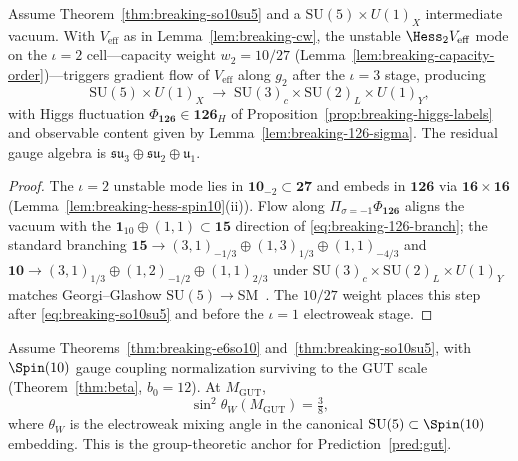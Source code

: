 \begin{theorem}\label{thm:breaking-su5sm}
Assume Theorem~\ref{thm:breaking-so10su5} and a
$\mathrm{SU}(5)\times U(1)_X$ intermediate vacuum. With $V_{\mathrm{eff}}$ as
in Lemma~\ref{lem:breaking-cw}, the unstable $\Hess_2 V_{\mathrm{eff}}$ mode on
the $\iota=2$ cell---capacity weight $w_2=10/27$
(Lemma~\ref{lem:breaking-capacity-order})---triggers gradient flow of
$V_{\mathrm{eff}}$ along $g_2$ after the $\iota=3$ stage, producing
\begin{equation}\label{eq:breaking-su5sm}
  \mathrm{SU}(5)\times U(1)_X
  \;\longrightarrow\;
  \mathrm{SU}(3)_c\times\mathrm{SU}(2)_L\times U(1)_Y,
\end{equation}
with Higgs fluctuation $\Phi_{\mathbf{126}}\in\mathbf{126}_H$ of
Proposition~\ref{prop:breaking-higgs-labels} and observable content given by
Lemma~\ref{lem:breaking-126-sigma}. The residual gauge algebra is
$\mathfrak{su}_3\oplus\mathfrak{su}_2\oplus\mathfrak{u}_1$.
\end{theorem}

\begin{proof}
The $\iota=2$ unstable mode lies in $\mathbf{10}_{-2}\subset\mathbf{27}$ and
embeds in $\mathbf{126}$ via $\mathbf{16}\times\mathbf{16}$
(Lemma~\ref{lem:breaking-hess-spin10}(ii)). Flow along
$\Pi_{\sigma=-1}\Phi_{\mathbf{126}}$ aligns the vacuum with the
$\mathbf{1}_{10}\oplus(1,1)\subset\mathbf{15}$ direction of
\eqref{eq:breaking-126-branch}; the standard branching
$\mathbf{15}\to(3,1)_{-1/3}\oplus(1,3)_{1/3}\oplus(1,1)_{-4/3}$ and
$\mathbf{10}\to(3,1)_{1/3}\oplus(1,2)_{-1/2}\oplus(1,1)_{2/3}$ under
$\mathrm{SU}(3)_c\times\mathrm{SU}(2)_L\times U(1)_Y$ matches Georgi--Glashow
$\mathrm{SU}(5)\to$SM~\cite{GeorgiGlashow1974}. The $10/27$ weight places this
step after \eqref{eq:breaking-so10su5} and before the $\iota=1$
electroweak stage.
\end{proof}

\begin{proposition}
\label{prop:weinberg-gut}
Assume Theorems~\ref{thm:breaking-e6so10} and~\ref{thm:breaking-so10su5}, with
$\Spin(10)$ gauge coupling normalization surviving to the GUT scale
(Theorem~\ref{thm:beta}, $b_0=12$). At $M_{\mathrm{GUT}}$,
\begin{equation}\label{eq:weinberg-gut}
  \sin^2\theta_W(M_{\mathrm{GUT}})=\tfrac38,
\end{equation}
where $\theta_W$ is the electroweak mixing angle in the canonical
$\mathrm{SU}(5)\subset\Spin(10)$ embedding. This is the group-theoretic anchor
for Prediction~\ref{pred:gut}.
\end{proposition}

